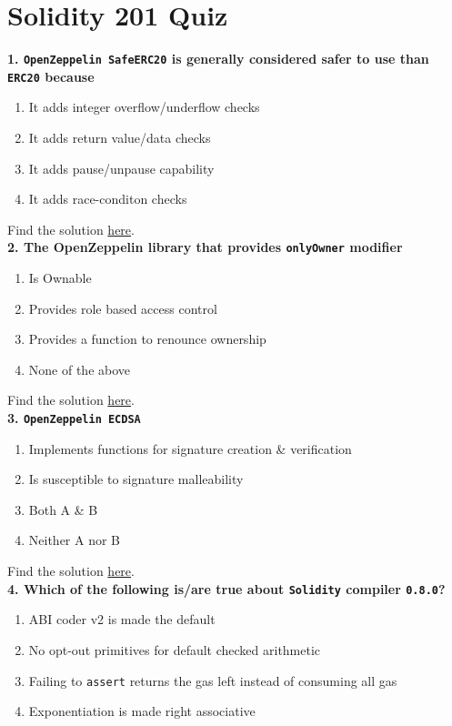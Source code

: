 \section{Solidity 201 Quiz}

\textbf{1. \texttt{OpenZeppelin SafeERC20} is generally considered safer to use than \texttt{ERC20} because}

\begin{enumerate}[label=\Alph*.]
    \item It adds integer overflow/underflow checks
    \item It adds return value/data checks
    \item It adds pause/unpause capability
    \item It adds race-conditon checks
\end{enumerate}

Find the solution \hyperref[sec:exam3_q1]{here}.\\

\textbf{2. The OpenZeppelin library that provides \texttt{onlyOwner} modifier}

\begin{enumerate}[label=\Alph*.]
    \item Is Ownable
    \item Provides role based access control
    \item Provides a function to renounce ownership
    \item None of the above
\end{enumerate}

Find the solution \hyperref[sec:exam3_q2]{here}.\\

\textbf{3. \texttt{OpenZeppelin ECDSA}}

\begin{enumerate}[label=\Alph*.]
    \item Implements functions for signature creation \& verification
    \item Is susceptible to signature malleability
    \item Both A \& B
    \item Neither A nor B
\end{enumerate}

Find the solution \hyperref[sec:exam3_q3]{here}.\\

\textbf{4. Which of the following is/are true about \texttt{Solidity} compiler \texttt{0.8.0}?}

\begin{enumerate}[label=\Alph*.]
    \item ABI coder v2 is made the default
    \item No opt-out primitives for default checked arithmetic
    \item Failing to \verb|assert| returns the gas left instead of consuming all gas
    \item Exponentiation is made right associative
\end{enumerate}

